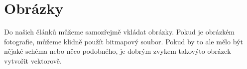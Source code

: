 \documentclass[11pt]{article}
\begin{document}
\section{Obrázky}
Do našich článků můžeme samozřejmě vkládat obrázky. Pokud je obrázkém fotografie, můžeme klidně použít bitmapový soubor. Pokud by to ale mělo být nějaké schéma nebo něco podobného, je dobrým zvykem takovýto obrázek vytvořit vektorově.

\begin{figure}[h]
    \centering
\end{figure}
\end{document}
